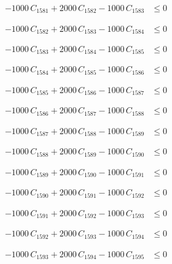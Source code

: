 \documentclass[a4paper,11pt]{article}
\begin{document}
\begin{align}
-1000\,C_{1581} + 2000\,C_{1582} - 1000\,C_{1583} &\leq 0 \nonumber
\end{align}

\begin{align}
-1000\,C_{1582} + 2000\,C_{1583} - 1000\,C_{1584} &\leq 0 \nonumber
\end{align}

\begin{align}
-1000\,C_{1583} + 2000\,C_{1584} - 1000\,C_{1585} &\leq 0 \nonumber
\end{align}

\begin{align}
-1000\,C_{1584} + 2000\,C_{1585} - 1000\,C_{1586} &\leq 0 \nonumber
\end{align}

\begin{align}
-1000\,C_{1585} + 2000\,C_{1586} - 1000\,C_{1587} &\leq 0 \nonumber
\end{align}

\begin{align}
-1000\,C_{1586} + 2000\,C_{1587} - 1000\,C_{1588} &\leq 0 \nonumber
\end{align}

\begin{align}
-1000\,C_{1587} + 2000\,C_{1588} - 1000\,C_{1589} &\leq 0 \nonumber
\end{align}

\begin{align}
-1000\,C_{1588} + 2000\,C_{1589} - 1000\,C_{1590} &\leq 0 \nonumber
\end{align}

\begin{align}
-1000\,C_{1589} + 2000\,C_{1590} - 1000\,C_{1591} &\leq 0 \nonumber
\end{align}

\begin{align}
-1000\,C_{1590} + 2000\,C_{1591} - 1000\,C_{1592} &\leq 0 \nonumber
\end{align}

\begin{align}
-1000\,C_{1591} + 2000\,C_{1592} - 1000\,C_{1593} &\leq 0 \nonumber
\end{align}

\begin{align}
-1000\,C_{1592} + 2000\,C_{1593} - 1000\,C_{1594} &\leq 0 \nonumber
\end{align}

\begin{align}
-1000\,C_{1593} + 2000\,C_{1594} - 1000\,C_{1595} &\leq 0 \nonumber
\end{align}
\end{document}
